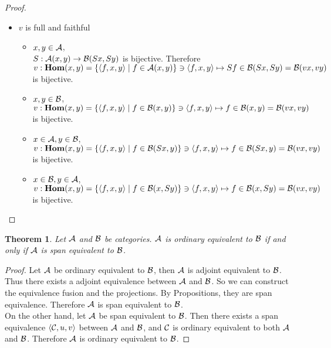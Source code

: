 \documentclass[12pt]{article}
\theoremstyle{plain}
\newtheorem{theorem}{Theorem}[section]
\theoremstyle{definition}
\begin{document}
\begin{proof}
\begin{itemize}
 \item $v$ is full and faithful
 \begin{itemize}
 \item $x,y \in {\cal A}$, \\
$S:{\cal A}{\rm (}x,y{\rm )} \rightarrow {\cal B}{\rm (}Sx,Sy{\rm )}$ is bijective. Therefore $v:{\bf Hom}{\rm (}x,y{\rm )}=\{ \langle f,x,y \rangle \mid f \in {\cal A}(x,y) \} \ni \langle f,x,y \rangle \mapsto Sf \in {\cal B}{\rm (}Sx,Sy{\rm )}={\cal B}{\rm (}vx,vy{\rm )}$ is bijective.
 \item $x,y \in {\cal B}$, \\
$v:{\bf Hom}{\rm (}x,y{\rm )}=\{ \langle f,x,y \rangle \mid f \in {\cal B}(x,y) \} \ni \langle f,x,y \rangle \mapsto f \in {\cal B}{\rm (}x,y{\rm )}={\cal B}{\rm (}vx,vy{\rm )}$ is bijective.
 \item $x \in {\cal A}, y \in {\cal B}$, \\
$v:{\bf Hom}{\rm (}x,y{\rm )}=\{ \langle f,x,y \rangle \mid f \in {\cal B}(Sx,y) \} \ni \langle f,x,y \rangle \mapsto f \in {\cal B}{\rm (}Sx,y{\rm )}={\cal B}{\rm (}vx,vy{\rm )}$ is bijective.
 \item $x \in {\cal B} , y \in {\cal A}$, \\
$v:{\bf Hom}{\rm (}x,y{\rm )}=\{ \langle f,x,y \rangle \mid f \in {\cal B}(x,Sy) \} \ni \langle f,x,y \rangle \mapsto f \in {\cal B}{\rm (}x,Sy{\rm )}={\cal B}{\rm (}vx,vy{\rm )}$ is bijective.
 \end{itemize}
 
\end{itemize}
\end{proof}


\begin{theorem}
Let ${\cal A}$ and ${\cal B}$ be categories. ${\cal A}$ is ordinary equivalent to ${\cal B}$ 
if and only if ${\cal A}$ is span equivalent to ${\cal B}$. 
\end{theorem}

\begin{proof} Let ${\cal A}$ be  ordinary equivalent to ${\cal B}$, then ${\cal A}$ is adjoint equivalent to ${\cal B}$. Thus there exists a adjoint equivalence between ${\cal A}$ and ${\cal B}$. So we can construct the equivalence fusion and the projections. By Propositions, they are span equivalence. Therefore ${\cal A}$ is span equivalent to ${\cal B}$. \\
On the other hand, let ${\cal A}$ be span equivalent to ${\cal B}$. Then there exists a span equivalence $\langle {\cal C},u,v \rangle$ between ${\cal A}$ and ${\cal B}$, and ${\cal C}$ is ordinary equivalent to both ${\cal A}$ and ${\cal B}$. Therefore ${\cal A}$ is ordinary equivalent to ${\cal B}$.
\end{proof}
\end{document}
